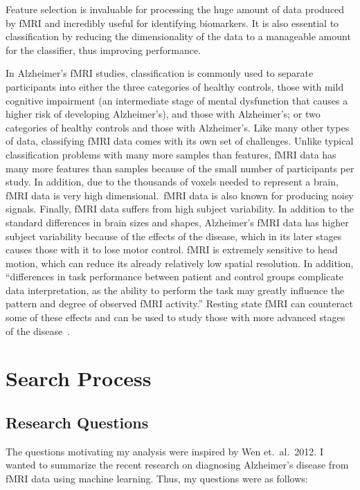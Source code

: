\documentclass[pageno]{jpaper}
\begin{document}
Feature selection is invaluable for processing the huge amount of data produced
by fMRI and incredibly useful for identifying biomarkers. It is also essential
to classification by reducing the dimensionality of the data to a manageable amount
for the classifier, thus improving performance\cite{Ye2011}.

In Alzheimer's fMRI studies, classification is commonly used to separate
participants into either the three categories of healthy controls, those with
mild cognitive impairment (an intermediate stage of mental dysfunction that
causes a higher risk of developing Alzheimer's\cite{Khazaee2015}), and those 
with Alzheimer's; or two categories of healthy controls and those with 
Alzheimer's\cite{Morra2010,Khazaee2015,Ye2011}.
Like many other types of data, classifying fMRI data comes with its own set of challenges.
Unlike typical classification problems with many more samples than features, fMRI data has many
more features than samples because of the small number of participants per study.
In addition, due to the thousands of voxels needed to represent a brain, fMRI data
is very high dimensional.\  fMRI data is also known for producing noisy signals.
Finally, fMRI data suffers from high subject variability. In addition to the
standard differences in brain sizes and shapes, Alzheimer's fMRI data has higher
subject variability because of the effects of the disease, which in its later stages
causes those with it to lose motor control. fMRI is extremely 
sensitive to head motion, which can reduce its already relatively low 
spatial resolution. In addition, ``differences in task performance 
between patient and control groups complicate data interpretation, as 
the ability to perform the task may greatly influence the pattern and 
degree of observed fMRI activity.'' Resting state fMRI can counteract
some of these effects and can be used to study those with more 
advanced stages of the disease~\cite{Kvisito}.

\section{Search Process}
\label{sec:Search Process}

\subsection{Research Questions}
\label{sub:Research Questions}
The questions motivating my analysis were inspired by Wen et.\ al.\ 2012\cite{Wen2012}.
I wanted to summarize the recent research on diagnosing Alzheimer's disease from
fMRI data using machine learning. Thus, my questions were as follows:
\end{document}
